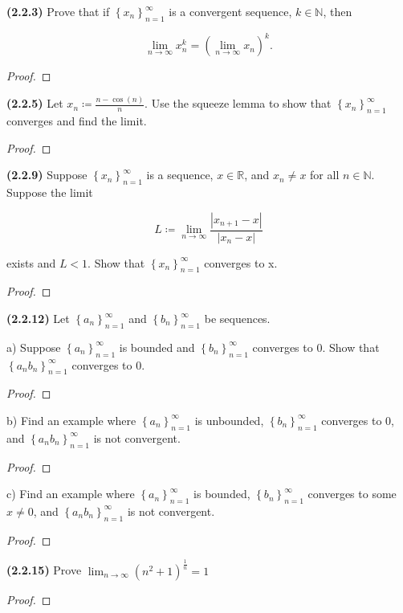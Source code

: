 \documentclass[12pt]{article}
\newcommand{\limtoinf}[1]{\lim_{ {#1} \to\infty}}
\newcommand{\abs}[1]{\left| {#1} \right|}
\newcommand{\seq}[2][n]{\left\{ {#2} \right\}_{#1=1}^\infty}
\newcommand{\paren}[1]{\left( {#1} \right)}
\newcommand{\bR}{\mathbb{R}}
\newcommand{\bN}{\mathbb{N}}
\begin{document}
\pagestyle{fancy}
\setlength{\headheight}{14.49998pt}
\fancyfoot[C]{\thepage}

\noindent \textbf{(2.2.3)} Prove that if $\seq{x_n}$ is a convergent sequence, $k\in\bN$, then

\begin{equation*}
	\limtoinf{n} x_n^k = \paren{\limtoinf{n} x_n}^k.
\end{equation*}

\begin{proof}
	\lipsum[1]
\end{proof}

\newpage

\noindent \textbf{(2.2.5)} Let $x_n\coloneq\frac{n-\cos(n)}{n}$. Use the squeeze lemma to show that $\seq{x_n}$ converges and find the limit.

\begin{proof}
	\lipsum[1]
\end{proof}

\newpage

\noindent \textbf{(2.2.9)} Suppose $\seq{x_n}$ is a sequence, $x\in\bR$, and $x_n\neq x$ for all $n\in\bN$. Suppose the limit

\begin{equation*}
	L\coloneq\limtoinf{n}\frac{\abs{x_{n+1}-x}}{\abs{x_n-x}}
\end{equation*}

\noindent exists and $L<1$. Show that $\seq{x_n}$ converges to x.

\begin{proof}
	\lipsum[1]
\end{proof}

\newpage

\noindent \textbf{(2.2.12)} Let $\seq{a_n}$ and $\seq{b_n}$ be sequences.

\noindent a) Suppose $\seq{a_n}$ is bounded and $\seq{b_n}$ converges to 0. Show that $\seq{a_nb_n}$ converges to 0.

\begin{proof}
	\lipsum[1]
\end{proof}

\noindent b) Find an example where $\seq{a_n}$ is unbounded, $\seq{b_n}$ converges to 0, and $\seq{a_nb_n}$ is not convergent.

\begin{proof}
	\lipsum[1]
\end{proof}

\noindent c) Find an example where $\seq{a_n}$ is bounded, $\seq{b_n}$ converges to some $x\neq0$, and $\seq{a_nb_n}$ is not convergent.

\begin{proof}
	\lipsum[1]
\end{proof}

\newpage

\noindent \textbf{(2.2.15)} Prove $\limtoinf{n}\paren{n^2+1}^\frac{1}{n}=1$

\begin{proof}
	\lipsum[1]
\end{proof}

\newpage
\end{document}
